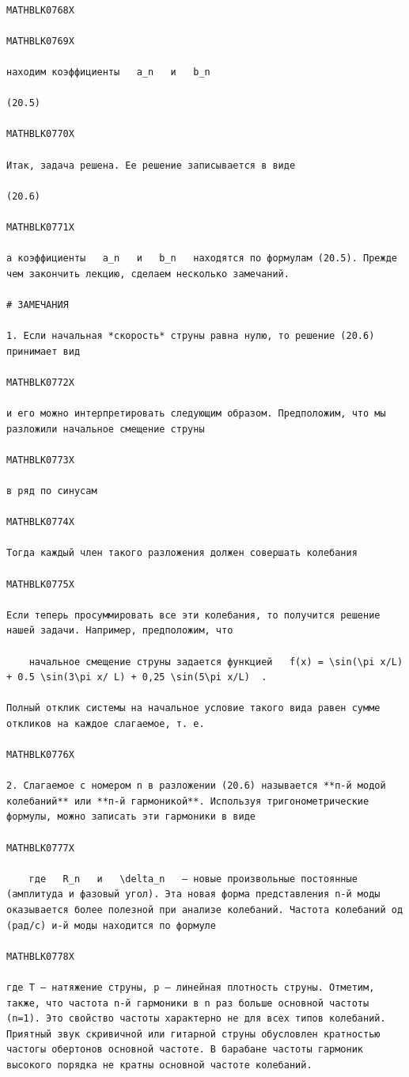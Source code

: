 \documentclass[
]{article}
\begin{document}
\begin{verbatim}

MATHBLK0768X

MATHBLK0769X

находим коэффициенты   a_n   и   b_n 

(20.5)

MATHBLK0770X

Итак, задача решена. Ее решение записывается в виде

(20.6)

MATHBLK0771X

а коэффициенты   a_n   и   b_n   находятся по формулам (20.5). Прежде чем закончить лекцию, сделаем несколько замечаний.

# ЗАМЕЧАНИЯ

1. Если начальная *скорость* струны равна нулю, то решение (20.6) принимает вид

MATHBLK0772X

и его можно интерпретировать следующим образом. Предположим, что мы разложили начальное смещение струны

MATHBLK0773X

в ряд по синусам

MATHBLK0774X

Тогда каждый член такого разложения должен совершать колебания

MATHBLK0775X

Если теперь просуммировать все эти колебания, то получится решение нашей задачи. Например, предположим, что

    начальное смещение струны задается функцией   f(x) = \sin(\pi x/L) + 0.5 \sin(3\pi x/ L) + 0,25 \sin(5\pi x/L)  .

Полный отклик системы на начальное условие такого вида равен сумме откликов на каждое слагаемое, т. е.

MATHBLK0776X

2. Слагаемое с номером n в разложении (20.6) называется **п-й модой колебаний** или **п-й гармоникой**. Используя тригонометрические формулы, можно записать эти гармоники в виде

MATHBLK0777X

    где   R_n   и   \delta_n   — новые произвольные постоянные (амплитуда и фазовый угол). Эта новая форма представления n-й моды оказывается более полезной при анализе колебаний. Частота колебаний од (рад/с) и-й моды находится по формуле

MATHBLK0778X

где Т — натяжение струны, р — линейная плотность струны. Отметим, также, что частота n-й гармоники в n раз больше основной частоты (n=1). Это свойство частоты характерно не для всех типов колебаний. Приятный звук скривичной или гитарной струны обусловлен кратностью частогы обертонов основной частоте. В барабане частоты гармоник высокого порядка не кратны основной частоте колебаний.


\end{verbatim}
\end{document}
